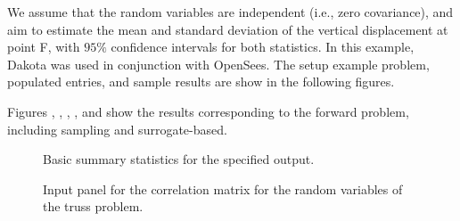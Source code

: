 We assume that the random variables are independent (i.e., zero covariance), and aim to estimate the mean and standard deviation of the vertical displacement at point F, with $95\%$ confidence intervals for both statistics. In this example, Dakota was used in conjunction with OpenSees. The setup example problem, populated entries, and sample results are show in the following figures.


Figures , , , , and  show the results corresponding to the forward problem, including sampling and surrogate-based. 

\begin{figure}[!htbp]
  \caption{Basic summary statistics for the specified output. }
  \label{fig:basic}
\end{figure}

\begin{figure}[!htbp]
  \caption{Input panel for the correlation matrix for the random variables of the truss problem. }
  \label{fig:correlation}
\end{figure}

